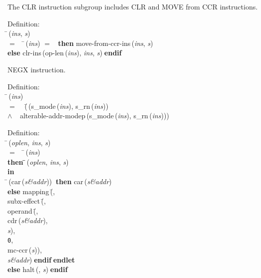  The CLR instruction subgroup includes CLR and MOVE from CCR instructions.
\begin{tabbing}{\sc Definition}: \\  
\=\,({\it{ins\/}}, {\it{s\/}}) \\ 
$=$$\;\;\;\;$\=\,({\it{ins\/}}) $=$ {}$\;\;${\bf then }{\rm{move-from-ccr-ins}}\,({\it{ins\/}}, {\it{s\/}}) \\ 
{\bf else }{\rm{clr-ins}}\,({\rm{op-len}}\,({\it{ins\/}}), {\it{ins\/}}, {\it{s\/}})$\;${\bf  endif}\-\-
\end{tabbing}

 NEGX instruction.
\begin{tabbing}{\sc Definition}: \\  
\=\,({\it{ins\/}}) \\ 
$=$$\;\;\;\;$(\=\,({\rm{s\_mode}}\,({\it{ins\/}}), {\rm{s\_rn}}\,({\it{ins\/}})) \\ 
$\wedge$$\;\;\;\;${\rm{alterable-addr-modep}}\,({\rm{s\_mode}}\,({\it{ins\/}}), {\rm{s\_rn}}\,({\it{ins\/}})))\-\-
\end{tabbing}

\begin{tabbing}{\sc Definition}: \\  
\=\,({\it{oplen\/}}, {\it{ins\/}}, {\it{s\/}}) \\ 
$=$$\;\;\;\;$\=\,({\it{ins\/}}) \\ 
{\bf then }\=\=\,({\it{oplen\/}}, {\it{ins\/}}, {\it{s\/}})\- \\ 
{\bf in} \\ 
\=\,({\rm{car}}\,({\it{s\&addr\/}}))$\;\;${\bf then }{\rm{car}}\,({\it{s\&addr\/}}) \\ 
{\bf else }{\rm{mapping}}\,(\=, \\ 
{\rm{subx-effect}}\,(\=, \\ 
{\rm{operand}}\,(\=, \\ 
{\rm{cdr}}\,({\it{s\&addr\/}}), \\ 
{\it{s\/}})\-, \\ 
{\tt{0}}, \\ 
{\rm{mc-ccr}}\,({\it{s\/}}))\-, \\ 
{\it{s\&addr\/}})\-$\;${\bf  endif}\-$\;${\bf  endlet}\- \\ 
{\bf else }{\rm{halt}}\,({}, {\it{s\/}})$\;${\bf  endif}\-\-
\end{tabbing}

